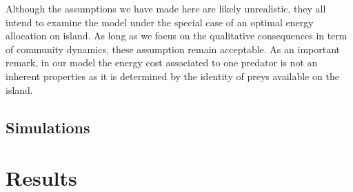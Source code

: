 Although the assumptions we have made here are likely unrealistic, they
all intend to examine the model under the special case of an optimal
energy allocation on island. As long as we focus on the qualitative
consequences in term of community dynamics, these assumption remain
acceptable. As an important remark, in our model the energy cost
associated to one predator is not an inherent properties as it is
determined by the identity of preys available on the island.

\subsection{Simulations}\label{simulations}

\section{Results}\label{results}
